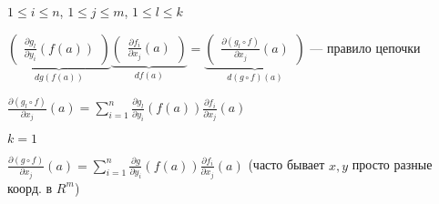 $1 \leqslant i \leqslant n$,
$1 \leqslant j \leqslant m$,
$1 \leqslant l \leqslant k$

$\underbrace{\begin{pmatrix}
    \frac{\partial g_l}{\partial y_i}(f(a))
\end{pmatrix}}_{dg(f(a))} \underbrace{\begin{pmatrix}
    \frac{\partial f_i}{\partial x_j}(a)
\end{pmatrix}}_{df(a)} = \underbrace{\begin{pmatrix}
    \frac{\partial (g_l \circ f)}{\partial x_j}(a)
\end{pmatrix}}_{d(g \circ f)(a)}$ --- правило цепочки

$\frac{\partial (g_l \circ f)}{\partial x_j}(a) = \sum_{i = 1}^{n} \frac{\partial g_l}{\partial y_i}(f(a)) \frac{\partial f_i}{\partial x_j}(a)$


$k = 1$

$\frac{\partial (g \circ f)}{\partial x_j}(a) = \sum_{i = 1} ^ n \frac{\partial g}{\partial y_i}(f(a)) \frac{\partial f_i}{\partial x_j}(a)$ (часто бывает $x, y$ просто разные коорд. в $R ^ m$)
